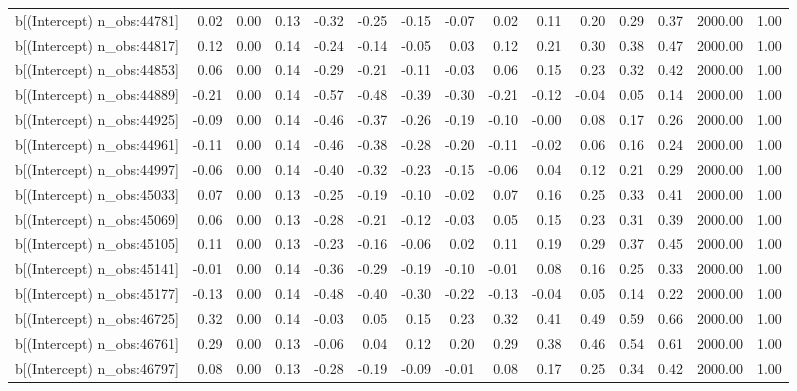 \begin{table}[ht]
\begin{tabular}{rrrrrrrrrrrrrrr}
  b[(Intercept) n\_obs:44781] & 0.02 & 0.00 & 0.13 & -0.32 & -0.25 & -0.15 & -0.07 & 0.02 & 0.11 & 0.20 & 0.29 & 0.37 & 2000.00 & 1.00 \\ 
  b[(Intercept) n\_obs:44817] & 0.12 & 0.00 & 0.14 & -0.24 & -0.14 & -0.05 & 0.03 & 0.12 & 0.21 & 0.30 & 0.38 & 0.47 & 2000.00 & 1.00 \\ 
  b[(Intercept) n\_obs:44853] & 0.06 & 0.00 & 0.14 & -0.29 & -0.21 & -0.11 & -0.03 & 0.06 & 0.15 & 0.23 & 0.32 & 0.42 & 2000.00 & 1.00 \\ 
  b[(Intercept) n\_obs:44889] & -0.21 & 0.00 & 0.14 & -0.57 & -0.48 & -0.39 & -0.30 & -0.21 & -0.12 & -0.04 & 0.05 & 0.14 & 2000.00 & 1.00 \\ 
  b[(Intercept) n\_obs:44925] & -0.09 & 0.00 & 0.14 & -0.46 & -0.37 & -0.26 & -0.19 & -0.10 & -0.00 & 0.08 & 0.17 & 0.26 & 2000.00 & 1.00 \\ 
  b[(Intercept) n\_obs:44961] & -0.11 & 0.00 & 0.14 & -0.46 & -0.38 & -0.28 & -0.20 & -0.11 & -0.02 & 0.06 & 0.16 & 0.24 & 2000.00 & 1.00 \\ 
  b[(Intercept) n\_obs:44997] & -0.06 & 0.00 & 0.14 & -0.40 & -0.32 & -0.23 & -0.15 & -0.06 & 0.04 & 0.12 & 0.21 & 0.29 & 2000.00 & 1.00 \\ 
  b[(Intercept) n\_obs:45033] & 0.07 & 0.00 & 0.13 & -0.25 & -0.19 & -0.10 & -0.02 & 0.07 & 0.16 & 0.25 & 0.33 & 0.41 & 2000.00 & 1.00 \\ 
  b[(Intercept) n\_obs:45069] & 0.06 & 0.00 & 0.13 & -0.28 & -0.21 & -0.12 & -0.03 & 0.05 & 0.15 & 0.23 & 0.31 & 0.39 & 2000.00 & 1.00 \\ 
  b[(Intercept) n\_obs:45105] & 0.11 & 0.00 & 0.13 & -0.23 & -0.16 & -0.06 & 0.02 & 0.11 & 0.19 & 0.29 & 0.37 & 0.45 & 2000.00 & 1.00 \\ 
  b[(Intercept) n\_obs:45141] & -0.01 & 0.00 & 0.14 & -0.36 & -0.29 & -0.19 & -0.10 & -0.01 & 0.08 & 0.16 & 0.25 & 0.33 & 2000.00 & 1.00 \\ 
  b[(Intercept) n\_obs:45177] & -0.13 & 0.00 & 0.14 & -0.48 & -0.40 & -0.30 & -0.22 & -0.13 & -0.04 & 0.05 & 0.14 & 0.22 & 2000.00 & 1.00 \\ 
  b[(Intercept) n\_obs:46725] & 0.32 & 0.00 & 0.14 & -0.03 & 0.05 & 0.15 & 0.23 & 0.32 & 0.41 & 0.49 & 0.59 & 0.66 & 2000.00 & 1.00 \\ 
  b[(Intercept) n\_obs:46761] & 0.29 & 0.00 & 0.13 & -0.06 & 0.04 & 0.12 & 0.20 & 0.29 & 0.38 & 0.46 & 0.54 & 0.61 & 2000.00 & 1.00 \\ 
  b[(Intercept) n\_obs:46797] & 0.08 & 0.00 & 0.13 & -0.28 & -0.19 & -0.09 & -0.01 & 0.08 & 0.17 & 0.25 & 0.34 & 0.42 & 2000.00 & 1.00 \\ 

\end{tabular}
\end{table}
